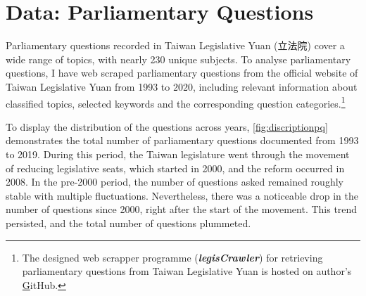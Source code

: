 
 

\section*{\centering Data: Parliamentary Questions \label{sec:pqdata}}

Parliamentary questions recorded in Taiwan Legislative Yuan (立法院) cover a wide range of topics, with nearly 230 unique subjects. To analyse parliamentary questions, I have web scraped parliamentary questions from the official website of Taiwan Legislative Yuan from 1993 to 2020, including relevant information about classified topics, selected keywords and the corresponding question categories.\footnote{The designed web scrapper programme (\textbf{\textit{legisCrawler}}) for retrieving parliamentary questions from Taiwan Legislative Yuan is hosted on author's \href{https://github.com/davidycliao/legisCrawler} GitHub.}



To display the distribution of the questions across years, \autoref{fig:discriptionpq} demonstrates the total number of parliamentary questions documented from 1993 to 2019. During this period, the Taiwan legislature went through the movement of reducing legislative seats, which started in 2000, and the reform occurred in 2008. In the pre-2000 period, the number of questions asked remained roughly stable with multiple fluctuations. Nevertheless, there was a noticeable drop in the number of questions since 2000, right after the start of the movement. This trend persisted, and the total number of questions plummeted. 

